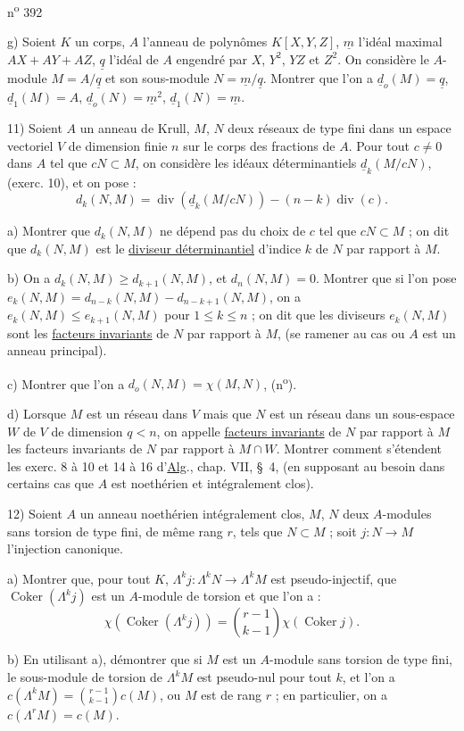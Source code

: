 n\textsuperscript{o} 392

g) Soient $K$ un corps, $A$ l'anneau de polynômes $K[X,Y,Z]$, $\underline m$ l'idéal maximal $AX+AY+AZ$, $\underline q$ l'idéal de $A$ engendré par $X$, $Y^2$, $YZ$ et $Z^2$. On considère le $A$-module $M=A/\underline q$ et son sous-module $N=\underline m/\underline q$. Montrer que l'on a $\underline d_o(M)=\underline q$, $\underline d_1(M)=A$, $\underline d_o(N)=\underline m^2$, $\underline d_1(N)=\underline m$.

11) Soient $A$ un anneau de Krull, $M$, $N$ deux réseaux de type fini dans un espace vectoriel $V$ de dimension finie $n$ sur le corps des fractions de $A$. Pour tout $c\ne 0$ dans $A$ tel que $cN\subset M$, on considère les idéaux déterminantiels $\underline d_k(M/cN)$, (exerc. 10), et on pose :
\[
 d_k(N,M)=\operatorname{div}(\underline d_k(M/cN))-(n-k)\operatorname{div}(c).
\]

a) Montrer que $d_k(N,M)$ ne dépend pas du choix de $c$ tel que $cN\subset M$ ; on dit que $d_k(N,M)$ est le \uline{diviseur déterminantiel} d'indice $k$ de $N$ par rapport à $M$.

b) On a $d_k(N,M)\geq d_{k+1}(N,M)$, et $d_n(N,M)=0$. Montrer que si l'on pose $e_k(N,M)=d_{n-k}(N,M)-d_{n-k+1}(N,M)$, on a $e_k(N,M)\leq e_{k+1}(N,M)$ pour $1\leq k\leq n$ ; on dit que les diviseurs $e_k(N,M)$ sont les \uline{facteurs invariants} de $N$ par rapport à $M$, (se ramener au cas o\rlap{\handwritten{\`{\phantom{u}}}}u $A$ est un anneau principal).

c) Montrer que l'on a $d_o(N,M)=\chi(M,N)$, (n\textsuperscript{o}\quad).

d) Lorsque $M$ est un réseau dans $V$ mais que $N$ est un réseau dans un sous-espace $W$ de $V$ de dimension $q<n$, on appelle \uline{facteurs invariants} de $N$ par rapport à $M$ les facteurs invariants de $N$ par rapport à $M\cap W$. Montrer comment s'étendent les exerc. 8 à 10 et 14 à 16 d'\uline{Alg}., chap. VII, \S~4, (en supposant au besoin dans certains cas que $A$ est noethérien et intégralement clos).

12) Soient $A$ un anneau noethérien intégralement clos, $M$, $N$ deux $A$-modules sans torsion de type fini, de même rang $r$, tels que $N\subset M$ ; soit $j:N\longrightarrow M$ l'injection canonique.

a) Montrer que, pour tout $K$, $\Lambda^k j:\Lambda^k N\longrightarrow\Lambda^k M$ est pseudo-injectif, que $\operatorname{Coker}(\Lambda^k j)$ est un $A$-module de torsion et que l'on a :
\[
 \chi(\operatorname{Coker}(\Lambda^k j))=\binom{r-1}{k-1}\chi(\operatorname{Coker}j).
\]

b) En utilisant a), démontrer que si $M$ est un $A$-module sans torsion de type fini, le sous-module de torsion de $\Lambda^k M$ est pseudo-nul pour tout $k$, et l'on a $c(\Lambda^k M)=\binom{r-1}{k-1}c(M)$, o\rlap{\handwritten{\`{\phantom{u}}}}u $M$ est de rang $r$ ; en particulier, on a $c(\Lambda^r M)=c(M)$.

